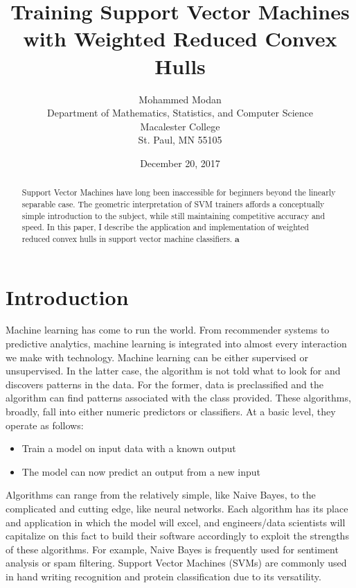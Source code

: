 \documentclass[11pt]{article}
\title{Training Support Vector Machines with Weighted Reduced Convex Hulls}
\author{Mohammed Modan \\  Department of Mathematics, Statistics, and Computer Science \\  Macalester College \\   St. Paul, MN 55105
}
\date{December 20, 2017}
\theoremstyle{remark}	  \newtheorem*{remark}{Remark}
\numberwithin{equation}{section}
\renewcommand{\vec}[1]{\mathbf{#1}}
\begin{document}
\maketitle

\begin{abstract}
\noindent
Support Vector Machines have long been inaccessible for beginners beyond the linearly separable case. The geometric interpretation of SVM trainers affords a conceptually simple introduction to the subject, while still maintaining competitive accuracy and speed. In this paper, I describe the application and implementation of weighted reduced convex hulls in support vector machine classifiers. $\vec{a}$

 \end{abstract}


\section{Introduction}

Machine learning has come to run the world. From recommender systems to predictive analytics, machine learning is integrated into almost every interaction we make with technology. Machine learning can be either supervised or unsupervised. In the latter case, the algorithm is not told what to look for and discovers patterns in the data. For the former, data is preclassified and the algorithm can find patterns associated with the class provided. These algorithms, broadly, fall into either numeric predictors or classifiers. At a basic level, they operate as follows:

\begin{itemize}
	\item Train a model on input data with a known output
	\item The model can now predict an output from a new input
\end{itemize}

Algorithms can range from the relatively simple, like Naive Bayes, to the complicated and cutting edge, like neural networks. Each algorithm has its place and application in which the model will excel, and engineers/data scientists will capitalize on this fact to build their software accordingly to exploit the strengths of these algorithms. For example, Naive Bayes is frequently used for sentiment analysis or spam filtering. Support Vector Machines (SVMs) are commonly used in hand writing recognition and protein classification due to its versatility.
\end{document}
